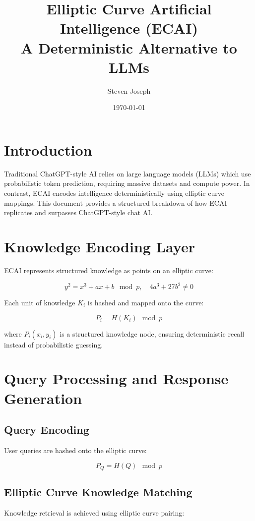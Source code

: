 \documentclass{article}
\title{Elliptic Curve Artificial Intelligence (ECAI) \\ \large A Deterministic Alternative to LLMs}
\author{Steven Joseph}
\date{\today}
\begin{document}
\maketitle

\section{Introduction}
Traditional ChatGPT-style AI relies on large language models (LLMs) which use probabilistic token prediction, requiring massive datasets and compute power. In contrast, ECAI encodes intelligence deterministically using elliptic curve mappings. This document provides a structured breakdown of how ECAI replicates and surpasses ChatGPT-style chat AI.

\section{Knowledge Encoding Layer}
ECAI represents structured knowledge as points on an elliptic curve:

\begin{equation}
    y^2 = x^3 + ax + b \mod p, \quad 4a^3 + 27b^2 \neq 0
\end{equation}

Each unit of knowledge \( K_i \) is hashed and mapped onto the curve:

\begin{equation}
    P_i = H(K_i) \mod p
\end{equation}

where \( P_i(x_i, y_i) \) is a structured knowledge node, ensuring deterministic recall instead of probabilistic guessing.

\section{Query Processing and Response Generation}
\subsection{Query Encoding}
User queries are hashed onto the elliptic curve:

\begin{equation}
    P_Q = H(Q) \mod p
\end{equation}

\subsection{Elliptic Curve Knowledge Matching}
Knowledge retrieval is achieved using elliptic curve pairing:
\end{document}
